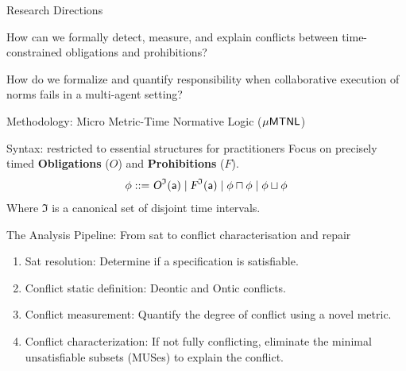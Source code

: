 \documentclass[9pt]{beamer}
\begin{document}
\begin{frame}{Research Directions}
  \begin{tcolorbox}[colback=blue!5, colframe=blue!80, title=RD1 / Chapter 2: Static Conflict Analysis]
    How can we formally detect, measure, and explain conflicts between time-constrained obligations and prohibitions?
  \end{tcolorbox}
  
  



  
  \begin{tcolorbox}[colback=green!5, colframe=green!80, title=RD2 / Chapter 3: Blame Attribution in multi-agent setting]
    How do we formalize and quantify responsibility when collaborative execution of norms fails in a multi-agent setting?
  \end{tcolorbox}
\end{frame} 





\begin{frame}{Methodology: Micro Metric-Time Normative Logic ($\mathsf{\mu MTNL}$)}
  \begin{block}{Syntax: restricted to essential structures for practitioners}
    Focus on precisely timed \textbf{Obligations} ($O$) and \textbf{Prohibitions} ($F$).
    \[
    \phi ::= \textsl{O}^{\mathfrak{I}}(\mathsf{a}) \mid \textsl{F}^{\mathfrak{I}}(\mathsf{a}) \mid \phi \sqcap \phi \mid \phi \sqcup \phi
    \]
    Where $\mathfrak{I}$ is a canonical set of disjoint time intervals.
  \end{block}

  \begin{block}{The Analysis Pipeline: From sat to conflict characterisation and repair}
\begin{enumerate}
  \item Sat resolution: Determine if a specification is satisfiable.
  \item Conflict static definition: Deontic and Ontic conflicts.
  \item Conflict measurement: Quantify the degree of conflict using a novel metric.
  \item Conflict characterization: If not fully conflicting, eliminate the minimal unsatisfiable subsets (MUSes) to explain the conflict.
\end{enumerate}
  \end{block}
\end{frame}
\end{document}

